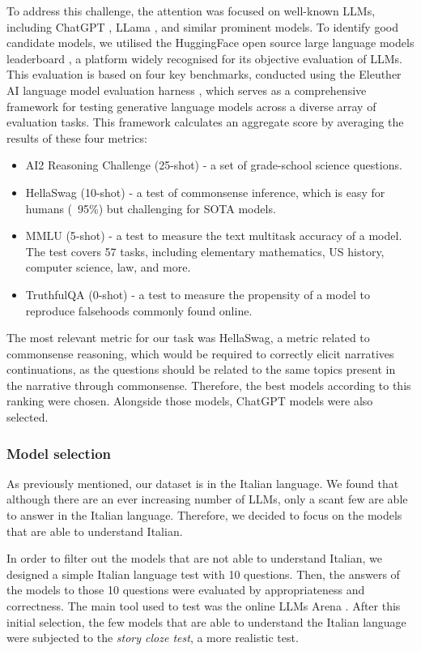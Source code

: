 To address this challenge, the attention was focused on well-known LLMs, including ChatGPT \cite{chatgpt}, LLama \cite{touvronllama}, and similar prominent models. To identify good candidate models, we utilised the HuggingFace open source large language models leaderboard \cite{huggingface-leaderboard}, a platform widely recognised for its objective evaluation of LLMs. This evaluation is based on four key benchmarks, conducted using the Eleuther AI language model evaluation harness \cite{eleuther}, which serves as a comprehensive framework for testing generative language models across a diverse array of evaluation tasks. This framework calculates an aggregate score by averaging the results of these four metrics:
\begin{itemize}
    \item {AI2 Reasoning Challenge (25-shot)} \cite{AI2} - a set of grade-school science questions.
    \item {HellaSwag (10-shot)} \cite{HellaSwag} - a test of commonsense inference, which is easy for humans (~95\%) but challenging for SOTA models.
    \item {MMLU (5-shot)} \cite{MMLU} - a test to measure the text multitask accuracy of a model. The test covers 57 tasks, including elementary mathematics, US history, computer science, law, and more.
    \item {TruthfulQA (0-shot)} \cite{Truthful} - a test to measure the propensity of a model to reproduce falsehoods commonly found online.
\end{itemize}
The most relevant metric for our task was HellaSwag, a metric related to commonsense reasoning, which would be required to correctly elicit narratives continuations, as the questions should be related to the same topics present in the narrative through commonsense. Therefore, the best models according to this ranking were chosen. Alongside those models, ChatGPT models were also selected. 

\subsubsection{Model selection}
As previously mentioned, our dataset is in the Italian language. We found that although there are an ever increasing number of LLMs, only a scant few are able to answer in the Italian language. Therefore, we decided to focus on the models that are able to understand Italian.

In order to filter out the models that are not able to understand Italian, we designed a simple Italian language test with 10 questions. Then, the answers of the models to those 10 questions were evaluated by appropriateness and correctness. The main tool used to test was the online LLMs Arena \cite{arena}. After this initial selection, the few models that are able to understand the Italian language were subjected to the \emph{story cloze test}, a more realistic test.

